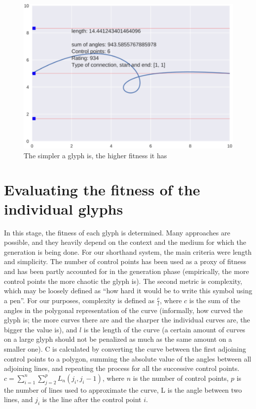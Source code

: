 \documentclass{vgtc}                          %
\begin{document}
\begin{figure}[tbp]
\centering
        \includegraphics[width=0.75\hsize]{e2.pdf}
\caption{The simpler a glyph is, the higher fitness it has}
\end{figure}

\section{Evaluating the fitness of the individual glyphs}
In this stage, the fitness of each glyph is determined. Many approaches are possible, and they heavily depend on the context and the medium for which the generation is being done. For our shorthand system, the main criteria were length and simplicity. The number of control points has been used as a proxy of fitness and has been partly accounted for in the generation phase (empirically, the more control points the more chaotic the glyph is). The second metric is complexity, which may be loosely
defined as “how hard it would be to write this symbol using a pen”. For our purposes, complexity is defined as \(\frac{c}{l}\), where \(c\) is the sum of the angles in the polygonal representation of the curve (informally, how curved the glyph is; the more curves there are and the sharper the individual curves are, the bigger the value is), and \(l\) is the length of the curve (a certain amount of curves on a large glyph should not be penalized as much as the same amount on a smaller one). C is calculated by converting the curve between the first adjoining control points to a polygon, summing the absolute value of the angles between all adjoining lines, and repeating the process for all the successive control points.
\(c=\sum_{i=1}^n\sum_{j=2}^{p}L_n(j_i, j_i-1)\), where \(n\) is the number of control points,  \(p\) is the number of lines used to approximate the curve, L is the angle between two lines,  and \(j_i\) is the line after the control point \(i\). 
\end{document}
